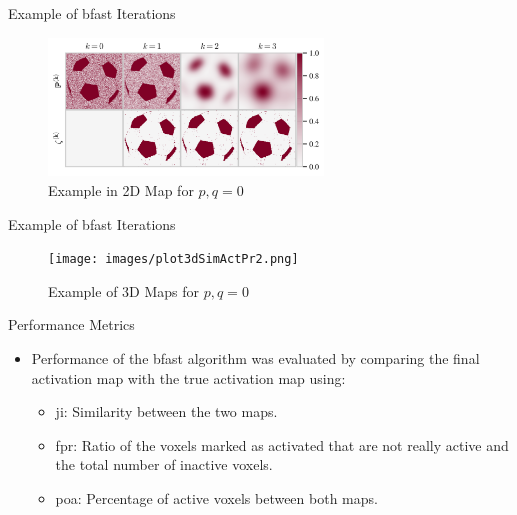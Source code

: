 \documentclass{beamer}
\begin{document}

\begin{frame}{Example of \gls{bfast} Iterations}
\begin{figure}
\centering
\includegraphics[width=0.65\textwidth]{images/bfastEx2D.png}
\caption{Example in 2D Map for $p,q=0$}
\end{figure}
\end{frame}

\begin{frame}{Example of \gls{bfast} Iterations}
\begin{figure}
\centering
\texttt{[image: images/plot3dSimActPr2.png]}
\caption{Example of 3D Maps for $p,q=0$}
\end{figure}
\end{frame}


\begin{frame}{Performance Metrics}
\begin{itemize}
\item Performance of the \gls{bfast} algorithm was evaluated by comparing 
the final activation map with the true activation map using:
\begin{itemize}
\item \gls{ji}: Similarity between the two maps.
\item \gls{fpr}: Ratio of the voxels marked as activated that are not 
really active and the total number of inactive voxels.
\item \gls{poa}: Percentage of active voxels between both maps.
\end{itemize}
\end{itemize}
\end{frame}
\end{document}
